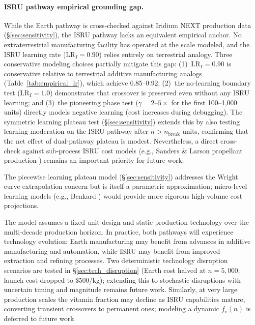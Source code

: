 \documentclass[preprint,12pt]{elsarticle}
\begin{document}
\paragraph{ISRU pathway empirical grounding gap.} While the Earth pathway is cross-checked against Iridium NEXT production data (\S\ref{sec:sensitivity}), the ISRU pathway lacks an equivalent empirical anchor. No extraterrestrial manufacturing facility has operated at the scale modeled, and the ISRU learning rate ($\mathrm{LR}_I = 0.90$) relies entirely on terrestrial analogy. Three conservative modeling choices partially mitigate this gap: (1)~$\mathrm{LR}_I = 0.90$ is conservative relative to terrestrial additive manufacturing analogs (Table~\ref{tab:empirical_lr}), which achieve 0.85--0.92; (2)~the no-learning boundary test ($\mathrm{LR}_I = 1.0$) demonstrates that crossover is preserved even without any ISRU learning; and (3)~the pioneering phase test ($\gamma = 2$--$5\times$ for the first 100--1{,}000 units) directly models negative learning (cost increases during debugging). The symmetric learning plateau test (\S\ref{sec:sensitivity}) extends this by also testing learning moderation on the ISRU pathway after $n > n_{\mathrm{break}}$ units, confirming that the net effect of dual-pathway plateau is modest. Nevertheless, a direct cross-check against sub-process ISRU cost models (e.g., Sanders \& Larson propellant production \cite{sanders2015}) remains an important priority for future work.

The piecewise learning plateau model (\S\ref{sec:sensitivity}) addresses the Wright curve extrapolation concern but is itself a parametric approximation; micro-level learning models (e.g., Benkard \cite{benkard2000}) would provide more rigorous high-volume cost projections.

The model assumes a fixed unit design and static production technology over the multi-decade production horizon. In practice, both pathways will experience technology evolution: Earth manufacturing may benefit from advances in additive manufacturing and automation, while ISRU may benefit from improved extraction and refining processes. Two deterministic technology disruption scenarios are tested in \S\ref{sec:tech_disruption} (Earth cost halved at $n = 5{,}000$; launch cost dropped to \$500/kg); extending this to stochastic disruptions with uncertain timing and magnitude remains future work. Similarly, at very large production scales the vitamin fraction may decline as ISRU capabilities mature, converting transient crossovers to permanent ones; modeling a dynamic $f_v(n)$ is deferred to future work.
\end{document}
